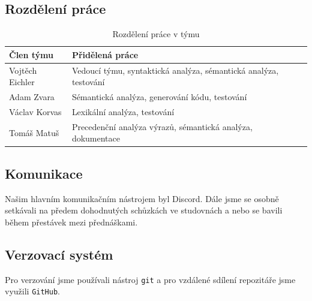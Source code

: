 \documentclass[11pt]{article}
\begin{document}
\subsection{Rozdělení práce}

\begin{table}[ht]
    \centering
    \begin{tabular}{|l|l|}
        \hline
        \textbf{Člen týmu} & \textbf{Přidělená práce} \\\hline
        Vojtěch Eichler & Vedoucí týmu, syntaktická analýza, sémantická analýza, testování \\
        Adam Zvara & Sémantická analýza, generování kódu, testování \\
        Václav Korvas & Lexikální analýza, testování \\
        Tomáš Matuš & Precedenční analýza výrazů, sémantická analýza, dokumentace \\\hline
    \end{tabular}
    \label{tabulka_rozdeleni_prace}
    \caption{Rozdělení práce v týmu}
\end{table}

\subsection{Komunikace}
Našim hlavním komunikačním nástrojem byl Discord.
Dále jsme se osobně setkávali na předem dohodnutých schůzkách ve studovnách a nebo se bavili během přestávek mezi přednáškami.

\subsection{Verzovací systém}
Pro verzování jsme používali nástroj \texttt{git} a pro vzdálené sdílení repozitáře jsme využili \texttt{GitHub}.
\end{document}
